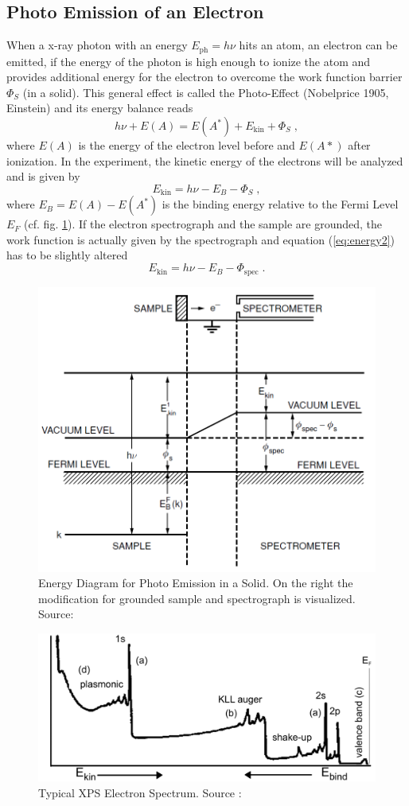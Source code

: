 \documentclass[a4paper]{scrartcl}
\numberwithin{equation}{section}
\numberwithin{figure}{section}
\numberwithin{table}{section}
\newcommand{\eq}[2]{\begin{equation}#1\label{#2}\end{equation}}
\newcommand{\Formel}[1]{(\ref{#1})}
\begin{document}
\subsection{Photo Emission of an Electron}
When a x-ray photon with an energy $E_\text{ph}=h\nu$ hits an atom, an electron can be emitted, if the energy of the photon is high enough to ionize the atom and provides additional energy for the electron to overcome the work function barrier $\Phi_S$ (in a solid). This general effect is called the Photo-Effect (Nobelprice 1905, Einstein) and its energy balance reads
\eq{h\nu +E(A) =E(A^*)+E_\text{kin} + \Phi_S \;,}{eq:energy}
where $E(A)$ is the energy of the electron level before and $E(A*)$ after ionization. In the experiment, the kinetic energy of the electrons will be analyzed and is given by
\eq{E_\text{kin}= h \nu - E_B -\Phi_S \; ,}{eq:energy2}
where $E_B=E(A)-E(A^*)$ is the binding energy relative to the Fermi Level $E_F$ (cf. fig. \ref{fig:energy}). If the electron spectrograph and the sample are grounded, the work function is actually given by the spectrograph and equation \Formel{eq:energy2} has to be slightly altered
\eq{E_\text{kin}= h \nu - E_B -\Phi_\text{spec} \; .}{eq:energy3}
\begin{figure}
  \centering
   	\includegraphics[width=0.6\linewidth]{img/energy.png}
 \caption{\small Energy Diagram for Photo Emission in a Solid. On the right the modification for grounded sample and spectrograph is visualized. Source: \cite{nano} }
        \label{fig:energy}
\end{figure}

\begin{figure}
  \centering
   	\includegraphics[width=0.6\linewidth]{img/spectrum.png}
 \caption{\small Typical XPS Electron Spectrum. Source : \cite{script} }
        \label{fig:spectrum}
\end{figure}
\end{document}
